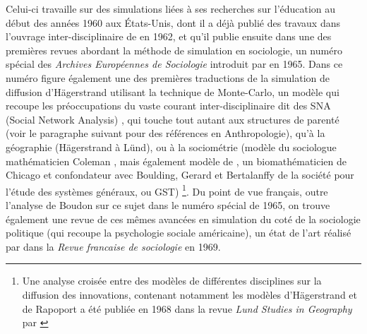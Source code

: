 Celui-ci travaille sur des simulations liées à ses recherches sur l'éducation au début des années 1960 aux États-Unis, dont il a déjà publié des travaux dans l'ouvrage inter-disciplinaire de \textcite{Guetzkow1962} en 1962, et qu'il publie ensuite \autocite{Coleman1965} dans une des premières revues abordant la méthode de simulation en sociologie, un numéro spécial des \textit{Archives Européennes de Sociologie} introduit par \textcite{Boudon1965} en 1965. Dans ce  numéro figure également une des premières traductions de la simulation de diffusion d'Hägerstrand \autocite{Hagerstrand1965} utilisant la technique de Monte-Carlo, un modèle qui recoupe les préoccupations du vaste courant inter-disciplinaire dit des SNA (Social Network Analysis) \autocite{Bernard2005}, qui touche tout autant aux structures de parenté (voir le paragraphe suivant pour des références en Anthropologie), qu'à la géographie (Hägerstrand à Lünd), ou à la sociométrie (modèle du sociologue mathématicien Coleman \textcite{Coleman1957}, mais également modèle de \textcite{Rapoport1961}, un biomathématicien de Chicago et confondateur avec Boulding, Gerard et Bertalanffy de la société pour l'étude des systèmes généraux, ou GST) \footnote{Une analyse croisée entre des modèles de différentes disciplines sur la diffusion des innovations, contenant notamment les modèles d'Hägerstrand et de Rapoport a été publiée en 1968 dans la revue \textit{Lund Studies in Geography} par \textcite{Brown1968}}. Du point de vue français, outre l'analyse de Boudon sur ce sujet dans le numéro spécial de 1965, on trouve également une revue de ces mêmes avancées en simulation du coté de la sociologie politique (qui recoupe la psychologie sociale américaine), un état de l'art réalisé par \textcite{Padioleau1969} dans la \textit{Revue francaise de sociologie} en 1969.

